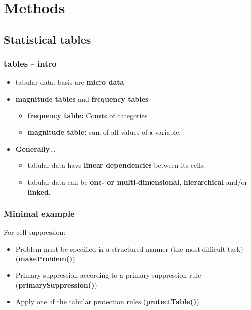 \documentclass[pdfpagelabels=false, usepdftitle=false]{beamer}
\begin{document}
\section{Methods}
\subsection{Statistical tables}
\begin{frame}\frametitle{tables - intro}
	\begin{itemize}
	    \item tabular data: basis are {\bf micro data} \pause
	    \item {\bf magnitude tables} and {\bf frequency tables} \pause
	    \begin{itemize}
	    	\item {\bf frequency table:} Counts of categories\pause
	    	\item {\bf magnitude table:} sum of all values of a variable. \pause
	    \end{itemize}
	    \item {\bf Generally...}
	    \begin{itemize}
	    	\item tabular data have {\bf linear dependencies} between its cells. \pause
	    	\item tabular data can be  {\bf one- or multi-dimensional}, {\bf hierarchical} and/or {\bf linked}.
		\end{itemize}
	\end{itemize}
\end{frame}







\begin{frame}[fragile]\frametitle{Minimal example}

For cell suppression:

\begin{itemize}
\item Problem must be specified in a structured manner (the most difficult task) (\textbf{makeProblem()})
\item Primary suppression according to a primary suppression rule (\textbf{primarySuppression()})
\item Apply one of the tabular protection rules (\textbf{protectTable()})
\end{itemize}

\end{frame}
\end{document}
